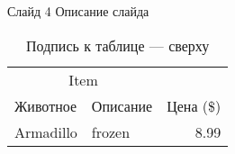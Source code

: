 
\begin{frame}{Слайд 4}
Описание слайда
    \begin{table}[H]
    \centering
    \caption{\label{tab:widgets}Подпись к таблице --- сверху}
        \begin{tabular}{llr}
            \toprule
                  \multicolumn{2}{c}{Item}        &           \\
            \cmidrule(r){1-2}
        Животное & Описание & Цена (\$) \\ \midrule
            Armadillo                  & frozen   &      8.99 \\ \bottomrule
        \end{tabular}
    \end{table}
\end{frame}